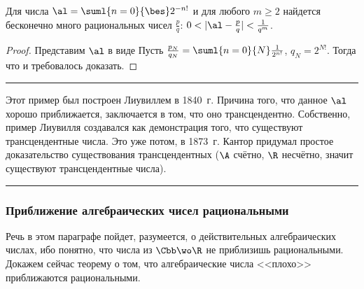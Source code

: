 \documentclass[a4paper]{article}
\newenvironment{petit}
{\par\smallskip\hrule\smallskip\footnotesize}{\par\smallskip\hrule\smallskip}
\begin{document}
\begin{stm}
Для числа $\al=\suml{n=0}{\bes}2^{-n!}$ и для любого $m\ge2$ найдется бесконечно много рациональных
чисел $\frac{p}{q}$: $0<|\al-\frac{p}q|<\frac1{q^m}$.
\end{stm}
\begin{proof}
Представим $\al$ в виде
Пусть $\frac{p_N}{q_N}=\suml{n=0}{N}\frac1{2^{n!}}$, $q_N=2^{N!}$. Тогда
что и требовалось доказать.
\end{proof}

\begin{petit}
Этот пример был построен Лиувиллем в 1840~г. Причина того, что данное $\al$ хорошо приближается, заключается в
том, что оно трансцендентно. Собственно, пример Лиувилля создавался как демонстрация того, что существуют
трансцендентные числа. Это уже потом, в 1873~г. Кантор придумал простое доказательство существования
трансцендентных ($\A$ счётно, $\R$ несчётно, значит существуют трансцендентные числа).
\end{petit}

\subsubsection{Приближение алгебраических чисел рациональными}

Речь в этом параграфе пойдет, разумеется, о действительных алгебраических числах, ибо понятно, что числа из
$\Cbb\wo\R$ не приблизишь рациональными. Докажем сейчас теорему о том, что
алгебраические числа <<плохо>> приближаются рациональными.
\end{document}
